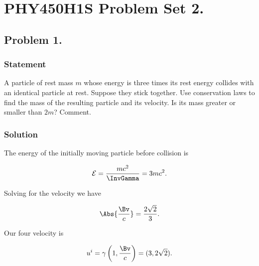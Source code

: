 %


\author{Peeter Joot}

\chapter{PHY450H1S Problem Set 2.}
\label{chap:relElectroDynProblemSet2}
\date{Feb 1, 2011}

\beginArtNoToc

\section{Problem 1.}
\subsection{Statement}

A particle of rest mass $m$ whose energy is three times its rest energy collides with an identical particle at rest.  Suppose they stick together.  Use conservation laws to find the mass of the resulting particle and its velocity.  Is its mass greater or smaller than $2m$?  Comment.

\subsection{Solution}

The energy of the initially moving particle before collision is

\begin{equation}\label{eqn:relElectroDynProblemSet2:10}
\mathcal{E} = \frac{m c^2 }{\InvGamma} = 3 m c^2.
\end{equation}

Solving for the velocity we have

\begin{equation}\label{eqn:relElectroDynProblemSet2:30}
\Abs{\frac{\Bv}{c}} = \frac{2 \sqrt{2}}{3}.
\end{equation}

Our four velocity is

\begin{equation}\label{eqn:relElectroDynProblemSet2:50}
u^i
= \gamma \left( 1, \frac{\Bv}{c} \right) = ( 3, 2 \sqrt{2} ).
\end{equation}

